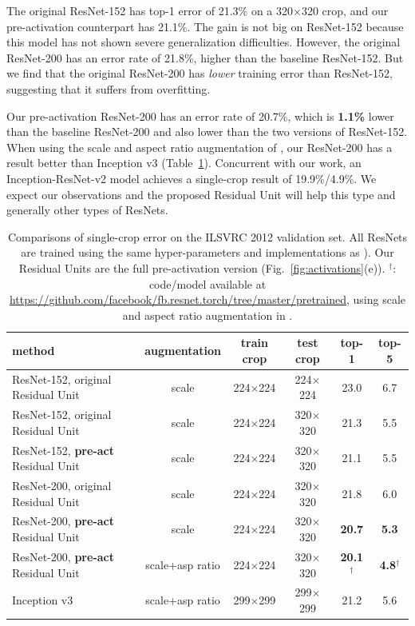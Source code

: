 \documentclass[runningheads]{llncs}
\begin{document}
The original ResNet-152 \cite{He2016} has top-1 error of 21.3\% on a 320$\times$320 crop, and our pre-activation counterpart has 21.1\%. The gain is not big on ResNet-152 because this model has not shown severe generalization difficulties. However, the original ResNet-200 has an error rate of 21.8\%, higher than the baseline ResNet-152.
But we find that the original ResNet-200 has \emph{lower} training error than ResNet-152, suggesting that it suffers from overfitting.

Our pre-activation ResNet-200 has an error rate of 20.7\%, which is \textbf{1.1\%} lower than the baseline ResNet-200 and also lower than the two versions of ResNet-152. When using the scale and aspect ratio augmentation of \cite{Szegedy2015,Szegedy2016a}, our ResNet-200 has a result better than Inception v3 \cite{Szegedy2016a} (Table~\ref{tab:imagenet}). Concurrent with our work, an Inception-ResNet-v2 model \cite{Szegedy2016} achieves a single-crop result of 19.9\%/4.9\%. We expect our observations and the proposed Residual Unit will help this type and generally other types of ResNets.

\renewcommand\arraystretch{1.2}
\setlength{\tabcolsep}{3pt}
\begin{table}[t]
\caption{Comparisons of single-crop error on the ILSVRC 2012 validation set. All ResNets are trained using the same hyper-parameters and implementations as \cite{He2016}). Our Residual Units are the full pre-activation version (Fig.~\ref{fig:activations}(e)). $^\dag$: code/model available at \url{https://github.com/facebook/fb.resnet.torch/tree/master/pretrained}, using scale and aspect ratio augmentation in \cite{Szegedy2015}.
}\label{tab:imagenet}
\centering
\fontsize{8pt}{1em}\selectfont
\begin{tabular}{l|c|c|c|c|c}
\hline
 \tiny method & \tiny augmentation & \tiny train crop & \tiny test crop & \tiny top-1 & \tiny top-5 \\
\hline
ResNet-152, original Residual Unit \cite{He2016} & scale & 224$\times$224 & 224$\times$224 & 23.0  & 6.7 \\
\hline
ResNet-152, original Residual Unit \cite{He2016} & scale & 224$\times$224 & 320$\times$320 & 21.3  & 5.5 \\
ResNet-152, \textbf{pre-act} Residual Unit & scale & 224$\times$224 & 320$\times$320 & 21.1 & 5.5 \\
\hline
ResNet-200, original Residual Unit \cite{He2016} & scale & 224$\times$224 & 320$\times$320 & 21.8 & 6.0 \\
ResNet-200, \textbf{pre-act} Residual Unit & scale & 224$\times$224 & 320$\times$320 & \textbf{20.7} & \textbf{5.3} \\
ResNet-200, \textbf{pre-act} Residual Unit & scale+asp ratio & 224$\times$224 & 320$\times$320 & \textbf{20.1}$^\dag$ & \textbf{4.8}$^\dag$ \\
\hline
Inception v3 \cite{Szegedy2016a} & scale+asp ratio & 299$\times$299 & 299$\times$299 & 21.2 & 5.6 \\
\hline
\end{tabular}
\end{table}
\end{document}
